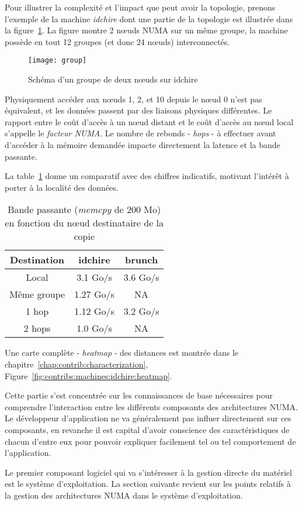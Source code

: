Pour illustrer la complexité et l'impact que peut avoir la topologie, prenons l'exemple de la machine \emph{idchire} dont une partie de la topologie est illustrée dans la figure~\ref{fig:context:group-idchire}.
La figure montre 2 nœuds NUMA sur un même groupe, la machine possède en tout 12 groupes (et donc 24 nœuds) interconnectés.

\begin{figure}[ht]
  \centering
  \texttt{[image: group]}
  \caption{Schéma d'un groupe de deux nœuds sur idchire}\label{fig:context:group-idchire}
\end{figure}


Physiquement accéder aux nœuds 1, 2, et 10 depuis le nœud 0 n'est pas équivalent, et les données passent par des liaisons physiques différentes.
Le rapport entre le coût d'accès à un nœud distant et le coût d'accès au nœud local s'appelle le \emph{facteur NUMA}.
Le nombre de rebonds - \emph{hops} - à effectuer avant d'accéder à la mémoire demandée impacte directement la latence et la bande passante.

La table~\ref{tab:topologie-hops} donne un comparatif avec des chiffres indicatifs, motivant l'intérêt à porter à la localité des données.

\begin{table}[ht]
\def\arraystretch{1.5}
\centering
\begin{tabular}{|c||c|c|}\hline
  Destination & idchire & brunch  \\ \hline
 Local & 3.1 Go/s & 3.6 Go/s \\ \hline
 Même groupe & 1.27 Go/s & NA \\ \hline
 1 hop & 1.12 Go/s & 3.2 Go/s \\ \hline
 2 hops & 1.0 Go/s & NA \\ \hline
\end{tabular}
\caption{Bande passante (\emph{memcpy} de 200 Mo) en fonction du nœud destinataire de la copie}\label{tab:topologie-hops}
\end{table}

Une carte complète - \emph{heatmap} - des distances est montrée dans le chapitre~\ref{chap:contrib:characterization}, Figure~\ref{fig:contribs:machines:idchire:heatmap}.

\bigskip

Cette partie s'est concentrée sur les connaissances de base nécessaires pour comprendre l'interaction entre les différents composants des architectures NUMA.
Le développeur d'application ne va généralement pas influer directement sur ces composants, en revanche il est capital d'avoir conscience des caractéristiques de chacun d'entre eux pour pouvoir expliquer facilement tel ou tel comportement de l'application.

Le premier composant logiciel qui va s'intéresser à la gestion directe du matériel est le système d'exploitation.
La section suivante revient sur les points relatifs à la gestion des architectures NUMA dans le système d'exploitation.
